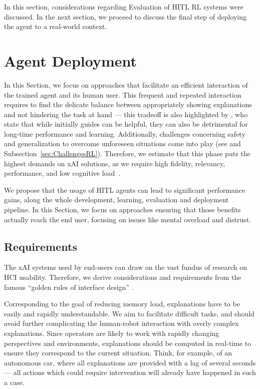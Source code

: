 \documentclass[twoside,11pt]{article}
\begin{document}
In this section, considerations regarding Evaluation of HITL RL systems were discussed. In the next section, we proceed to discuss the final step of deploying the agent to a real-world context.

\section{Agent Deployment}
\label{sec:Deployment}

In this Section, we focus on approaches that facilitate an efficient interaction of the trained agent and its human user. This frequent and repeated interaction requires to find the delicate balance between appropriately showing explanations and not hindering the task at hand --- this tradeoff is also highlighted by \citet{AndersonBischof:2013:PerformanceGestureGuides}, who state that while initially guides can be helpful, they can also be detrimental for long-time performance and learning. Additionally, challenges concerning safety and generalization to overcome unforeseen situations come into play (see \citet{RoyEtAl:2021:RLRoboticsChallenges} and Subsection~\ref{sec:ChallengesRL}). Therefore, we estimate that this phase puts the highest demands on xAI solutions, as we require high fidelity, relevancy, performance, and low cognitive load~\citep{milani2022survey}.

We propose that the usage of HITL agents can lead to significant performance gains, along the whole development, learning, evaluation and deployment pipeline. In this Section, we focus on approaches ensuring that those benefits actually reach the end user, focusing on issues like mental overload and distrust.

\subsection{Requirements}

The xAI systems used by end-users can draw on the vast fundus of research on HCI usability. Therefore, we derive considerations and requirements from the famous ``golden rules of interface design'' \citep{ShneidermanEtAl:2016:GoldenRulesHCI}.

Corresponding to the goal of reducing memory load, explanations have to be easily and rapidly understandable. We aim to facilitate difficult tasks, and should avoid further complicating the human-robot interaction with overly complex explanations. Since operators are likely to work with rapidly changing perspectives and environments, explanations should be computed in real-time to ensure they correspond to the current situation. Think, for example, of an autonomous car, where all explanations are provided with a lag of several seconds --- all actions which could require intervention will already have happened in such a case. 
\end{document}
